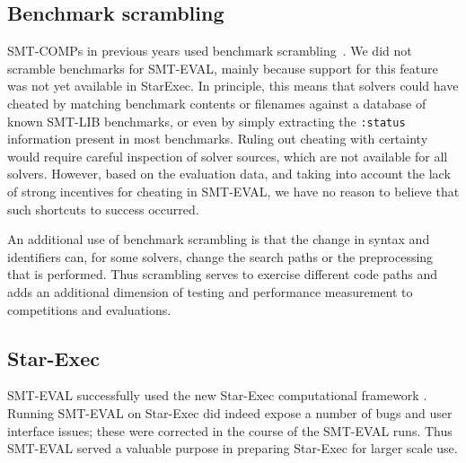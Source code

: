 \documentclass{eptcs}
\begin{document}
\subsection{Benchmark scrambling}

SMT-COMPs in previous years used benchmark scrambling~\cite{springerlink:10.1007/s10817-012-9246-5}.  We
did not scramble benchmarks for SMT-EVAL, mainly because support for
this feature was not yet available in StarExec.  In principle, this
means that solvers could have cheated by matching benchmark contents
or filenames against a database of known SMT-LIB benchmarks, or even
by simply extracting the {\tt :status} information present in most
benchmarks.  Ruling out cheating with certainty would require careful
inspection of solver sources, which are not available for all solvers.
However, based on the evaluation data, and taking into account the
lack of strong incentives for cheating in SMT-EVAL, we have no reason
to believe that such shortcuts to success occurred.

An additional use of benchmark scrambling is that the change in syntax and identifiers can, for some solvers,
change the search paths or the preprocessing that is performed. Thus scrambling serves to exercise 
different code paths and adds an additional dimension of testing and performance measurement to 
competitions and evaluations.

\subsection{Star-Exec}

SMT-EVAL successfully used the new Star-Exec computational framework \cite{webStarExec,StuST-IJCAR-14}. Running SMT-EVAL on Star-Exec did indeed expose a number of bugs and user interface issues; these were corrected in the course of the SMT-EVAL runs. Thus SMT-EVAL served a valuable purpose in preparing Star-Exec for larger scale use.
\end{document}
